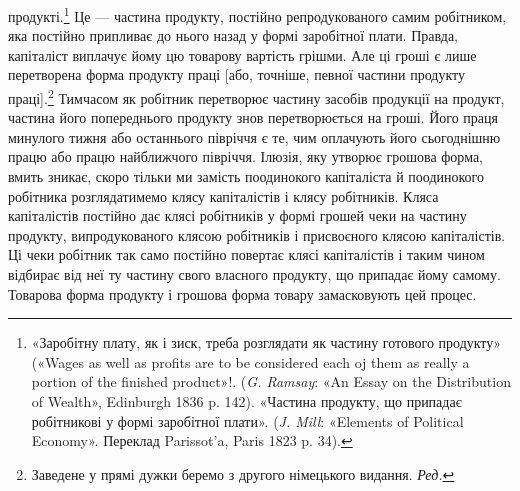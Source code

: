\parcont{}  %
продукті.\footnote{
«Заробітну плату, як і зиск, треба розглядати як частину готового
продукту» («Wages as well as profits are to be considered each oj
them as really a portion of the finished product»!. (\emph{G. Ramsay}: «An Essay
on the Distribution of Wealth», Edinburgh 1836 p. 142). «Частина продукту,
що припадає робітникові у формі заробітної плати». (\emph{J. Mill}:
«Elements of Political Economy». Переклад Parissot’a, Paris 1823 p. 34).
} Це — частина продукту, постійно репродукованого
самим робітником, яка постійно припливає до нього назад у
формі заробітної плати. Правда, капіталіст виплачує йому цю
товарову вартість грішми. Але ці гроші є лише перетворена форма
продукту праці [або, точніше, певної частини продукту праці].\footnote*{
Заведене у прямі дужки беремо з другого німецького видання. \emph{Ред.}
}
Тимчасом як робітник перетворює частину засобів продукції
на продукт, частина його попереднього продукту знов перетворюється
на гроші. Його праця минулого тижня або останнього
півріччя є те, чим оплачують його сьогоднішню працю або працю
найближчого півріччя. Ілюзія, яку утворює грошова форма,
вмить зникає, скоро тільки ми замість поодинокого капіталіста
й поодинокого робітника розглядатимемо клясу капіталістів і
клясу робітників. Кляса капіталістів постійно дає клясі робітників
у формі грошей чеки на частину продукту, випродукованого
клясою робітників і присвоєного клясою капіталістів. Ці
чеки робітник так само постійно повертає клясі капіталістів і
таким чином відбирає від неї ту частину свого власного продукту,
що припадає йому самому. Товарова форма продукту і грошова
форма товару замасковують цей процес.

